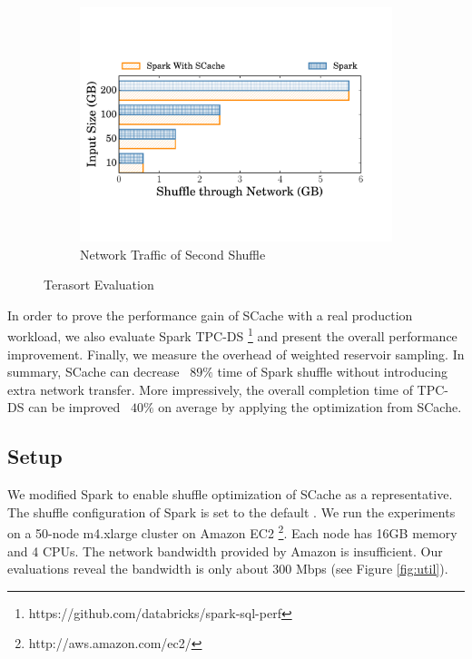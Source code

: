 \begin{figure}
\begin{minipage}[t]{.32\linewidth}
\begin{subfigure}{\linewidth}
			\begin{minipage}{\linewidth}
				\includegraphics[width=\linewidth]{fig/tera_shuffle}
				\caption{Network Traffic of Second Shuffle}
				\label{fig:terashuffle}
			\end{minipage}
		\end{subfigure}
		\caption{Terasort Evaluation}
	\end{minipage}
	\vspace{-1em}
\end{figure}
In order to prove the performance gain of SCache with a real production workload, we also evaluate Spark TPC-DS \footnote{https://github.com/databricks/spark-sql-perf} and present the overall performance improvement.
Finally, we measure the overhead of weighted reservoir sampling. 
In summary, SCache can decrease ~$89\%$ time of Spark shuffle without introducing extra network transfer. 
More impressively, the overall completion time of TPC-DS can be improved ~$40\%$ on average by applying the optimization from SCache.

\subsection{Setup}\label{stepup}
\ifrevision
{}
\fi
We modified Spark to enable shuffle optimization of SCache as a representative.
The shuffle configuration of Spark is set to the default \cite{sparkconf}. 
We run the experiments on a 50-node m4.xlarge cluster on Amazon EC2 \footnote{http://aws.amazon.com/ec2/}. 
Each node has 16GB memory and 4 CPUs. The network bandwidth provided by Amazon is insufficient. 
Our evaluations reveal the bandwidth is only about 300 Mbps (see Figure \ref{fig:util}).

